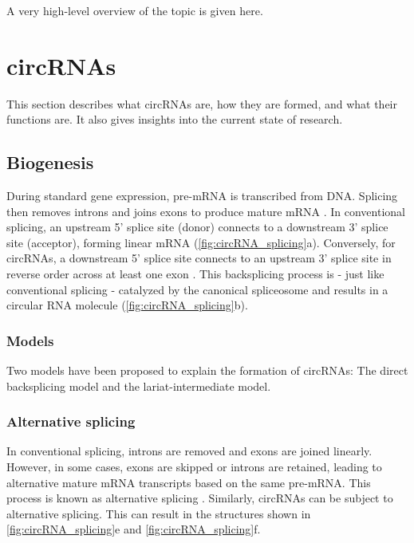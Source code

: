 A very high-level overview of the topic is given here.

\lipsum[1]

\section{circRNAs}
This section describes what circRNAs are, how they are formed, and what their
functions are. It also gives insights into the current state of research.

\subsection{Biogenesis}
During standard gene expression, pre-mRNA is transcribed from DNA. Splicing then
removes introns and joins exons to produce mature mRNA
\supercite{black_mechanisms_2003}. In conventional splicing, an upstream 5'
splice site (donor) connects to a downstream 3' splice site (acceptor), forming
linear mRNA (\cref{fig:circRNA_splicing}a). Conversely, for circRNAs, a
downstream 5' splice site connects to an upstream 3' splice site in reverse
order across at least one exon \supercite{chen_expanding_2020}. This
backsplicing process is - just like conventional splicing - catalyzed by the
canonical spliceosome \supercite{starke_exon_2015} and results in a circular RNA
molecule (\cref{fig:circRNA_splicing}b).

\subsubsection{Models}
Two models have been proposed to explain the formation of circRNAs: The direct
backsplicing model and the lariat-intermediate model.

\subsubsection{Alternative splicing}
In conventional splicing, introns are removed and exons are joined linearly.
However, in some cases, exons are skipped or introns are retained, leading to
alternative mature mRNA transcripts based on the same pre-mRNA. This process is
known as alternative splicing \supercite{nilsen_expansion_2010}. Similarly,
circRNAs can be subject to alternative splicing. This can result in the
structures shown in \cref{fig:circRNA_splicing}e and
\cref{fig:circRNA_splicing}f.

